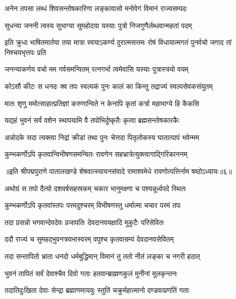\twolineshloka
{अनेन तपसा लब्धं शिवसन्तोषकारिणा}
{लङ्कावासो मनोवेगं विमानं राज्यसम्पदः}%

\twolineshloka
{सुधन्या जननी त्वस्य सुभाग्या सुमहोदया}
{यस्याः पुत्रो निजगुणैर्लब्धवान्महतां पदम्}%

\twolineshloka
{इति क्रुधा भाषितमार्तया तया मात्रा स्वयाऽकर्ण्य दुरात्मसत्तमः}
{रोषं विधायात्मगतं पुनर्वचो जगाद तां निश्चयभृत्तपः प्रति}%


\twolineshloka
{जनन्याकर्णय वचो मम गर्वसमन्वितम्}
{रत्नगर्भा त्वमेवासि यस्याः पुत्रास्त्रयो वयम्}%

\twolineshloka
{कोऽसौ कीटः स धनदः क्व तपः स्वल्पकं पुनः}
{कालं का किन्तु तद्राज्यं स्वल्पसेवकसंयुतम्}%

\twolineshloka
{मातः शृणु ममोत्साहात्प्रतिज्ञां करुणान्विते}
{न केनापि कृतां कर्त्रा महाभाग्ये हि कैकसि}%

\twolineshloka
{यद्यहं भुवनं सर्वं वशेन स्थापयामि वै}
{तपोभिर्दुष्कृतैः कृत्वा ब्रह्मसन्तोषकारकैः}%

\twolineshloka
{अन्नोदके सदा त्यक्त्वा निद्रां क्रीडां तथा पुनः}
{चेत्तदा पितृलोकस्य घातात्पापं भवेन्मम}%

\twolineshloka
{कुम्भकर्णोऽपि कृतवान्विभीषणसमन्वितः}
{रावणेन सहभ्रात्रेत्युक्त्वागाद्गिरिकाननम्}%

{॥इति श्रीपद्मपुराणे पातालखण्डे शेषवात्स्यायनसंवादे रामाश्वमेधे रावणोत्पत्तिर्नाम षष्ठोऽध्यायः॥६॥}



\twolineshloka
{अथोग्रं स तपो दैत्यो दशवर्षसहस्रकम्}
{चकार भानुमक्ष्णा च पश्यन्नूर्ध्वपदे स्थितः}%

\twolineshloka
{कुम्भकर्णोऽपि कृतवांस्तपः परमदुश्चरम्}
{विभीषणस्तु धर्मात्मा चचार परमं तपः}%

\twolineshloka
{तदा प्रसन्नो भगवान्देवदेवः प्रजापतिः}
{देवदानवयक्षादि मुकुटैः परिसेवितः}%

\twolineshloka
{ददौ राज्यं च सुमहद्भुवनत्रयभास्वरम्}
{वपुश्च कृतवान्रम्यं देवदानवसेवितम्}%

\twolineshloka
{तदा सन्तापितो भ्राता धनदो धर्मबुद्धिमान्}
{विमानं तु ततो नीतं लङ्का च नगरी हठात्}%

\twolineshloka
{भुवनं तापितं सर्वं देवाश्चैव दिवो गताः}
{हतवान्ब्राह्मणकुलं मुनीनां मूलकृन्तनः}%

\twolineshloka
{तदातिदुःखिता देवाः सेन्द्रा ब्रह्माणमाययुः}
{स्तुतिं चक्रुर्महात्मानो दण्डवत्प्रणतिं गताः}%

